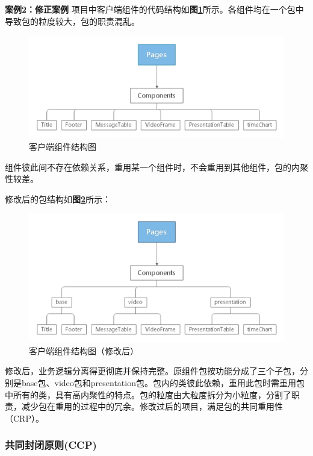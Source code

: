 \documentclass[article]{BJTU-thesis}
\begin{document}
\textbf{案例2：修正案例} 项目中客户端组件的代码结构如\textbf{图\ref{fig:fig8}}所示。各组件均在一个包中导致包的粒度较大，包的职责混乱。

\begin{figure}[!htbp]
	\centering
	\includegraphics[scale=0.8]{img/8.png}
	\caption{客户端组件结构图}\label{fig:fig8}
\end{figure}

组件彼此间不存在依赖关系，重用某一个组件时，不会重用到其他组件，包的内聚性较差。

修改后的包结构如\textbf{图\ref{fig:fig9}}所示：

\begin{figure}[!htbp]
	\centering
	\includegraphics[scale=0.8]{img/9.png}
	\caption{客户端组件结构图（修改后）}\label{fig:fig9}
\end{figure}

修改后，业务逻辑分离得更彻底并保持完整。原组件包按功能分成了三个子包，分别是base包、video包和presentation包。包内的类彼此依赖，重用此包时需重用包中所有的类，具有高内聚性的特点。包的粒度由大粒度拆分为小粒度，分割了职责，减少包在重用的过程中的冗余。修改过后的项目，满足包的共同重用性（CRP）。

\subsubsection{共同封闭原则(CCP)}
\end{document}

